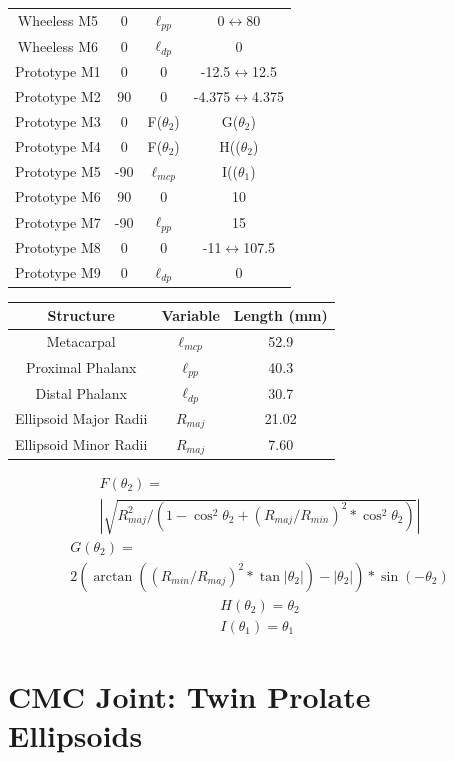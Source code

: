 \documentclass[letterpaper, 10 pt, conference]{ieeeconf}  %
\begin{document}
\begin{table}
\begin{tabular}{c|c|c|c}
		Wheeless M5 & 0 & $\ell_{pp}$ & 0$\leftrightarrow$80 \\
		Wheeless M6 & 0 & $\ell_{dp}$ & 0 \\
		\hline
		Prototype M1 & 0 & 0 & -12.5$\leftrightarrow$12.5 \\
		Prototype M2 & 90 & 0 & -4.375$\leftrightarrow$4.375\\
		Prototype M3 & 0 & F($\theta_2$) & G($\theta_2$) \\
		Prototype M4 & 0 & F($\theta_2$) & H(($\theta_2$) \\
		Prototype M5 & -90 & $\ell_{mcp}$ & I(($\theta_1$) \\
		Prototype M6 & 90 & 0 & 10 \\
		Prototype M7 & -90 & $\ell_{pp}$ & 15 \\
		Prototype M8 & 0 & 0 & -11$\leftrightarrow$107.5 \\
		Prototype M9 & 0 & $\ell_{dp}$ & 0\\
		\hline
		\hline
	\end{tabular}
	\begin{tabular}{c|c|c}
	Structure & Variable & Length (mm) \\
	\hline
	Metacarpal & $\ell_{mcp}$ & 52.9 \\
	Proximal Phalanx & $\ell_{pp}$ & 40.3 \\
	Distal Phalanx & $\ell_{dp}$ & 30.7 \\
	Ellipsoid Major Radii & $R_{maj}$ & 21.02 \\
	Ellipsoid Minor Radii & $R_{maj}$ & 7.60 \\
	\hline
	\hline
	\end{tabular}
\end{table}

\begin{multline}
	F(\theta_2) = \\
	|\sqrt{R_{maj}^{2}/(1-\cos^{2}\theta_2+(R_{maj}/R_{min})^{2}*\cos^{2}\theta_2)}| 
	\end{multline}
\begin{multline}
	G(\theta_2) = \\
	2(\arctan((R_{min}/R_{maj})^{2}*\tan|\theta_2|)-|\theta_2|)*\sin(-\theta_2) 
	\end{multline}
	\vspace{-12pt}
	\begin{eqnarray}
	H(\theta_2) = \theta_2 \\
	I(\theta_1) = \theta_1 
\end{eqnarray}

\section{CMC Joint: Twin Prolate Ellipsoids}
\end{document}
